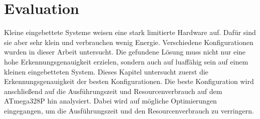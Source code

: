 \chapter{Evaluation}
Kleine eingebettete Systeme weisen eine stark limitierte Hardware auf. Dafür sind sie aber sehr klein und verbrauchen wenig Energie. Verschiedene Konfigurationen wurden in dieser Arbeit untersucht. Die gefundene
Lösung muss nicht nur eine hohe Erkennungsgenauigkeit erzielen, sondern auch auf luaffähig sein auf einem kleinen eingebetteten System.
\newline
\newline
Dieses Kapitel untersucht zuerst die Erkennungsgenauigkeit der besten Konfigurationen. Die beste Konfiguration wird anschließend auf die Ausführungszeit und Resourcenverbrauch auf dem ATmega328P hin analysiert.
Dabei wird auf mögliche Optimierungen eingegangen, um die Ausführungszeit und den Resourcenverbrauch zu verringern.



